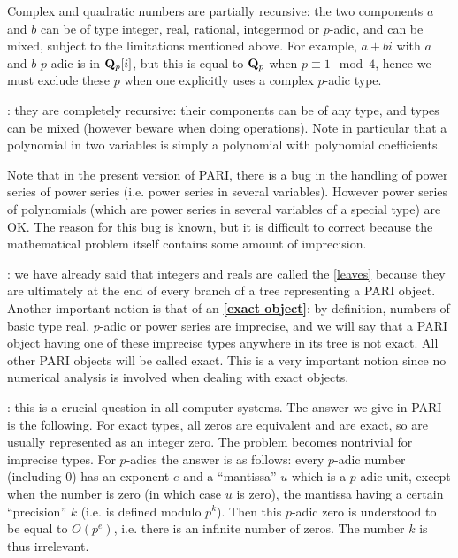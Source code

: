  Complex and quadratic numbers are partially recursive: the two components
$a$ and $b$ can be of type integer, real, rational, integermod or $p$-adic,
and can
be mixed, subject to the limitations mentioned above. For example,
$a+bi$ with $a$ and $b$ $p$-adic is in $\Bbb Q_p[i]$, but this is equal to
$\Bbb Q_p$
when $p\equiv 1 \mod 4$, hence we must exclude these $p$ when one explicitly
uses
a complex $p$-adic type.

: 
they are completely recursive:
their components can be of any type, and types can be mixed
(however beware when doing operations). Note in particular that a polynomial
in two variables is simply a polynomial with polynomial coefficients.

Note that in the present version \vers{} of PARI, there is a bug in the handling
of power series of power series (i.e. power series in several variables).
However power series of polynomials (which are power series in several
variables of a special type) are OK. The reason for this bug is known,
but it is difficult to correct because the mathematical problem itself
contains some amount of imprecision.

: we have already
said that integers and reals are called the \ref{leaves} because they are
ultimately
at the end of every branch of a tree representing a PARI object. Another
important notion is that of an {\bf \ref{exact object}}: by definition,
numbers of basic type real, $p$-adic or power series are imprecise, and we
will
say that a PARI object having one of these imprecise types anywhere in its
tree
is not exact. All other PARI objects will be called exact. This is a very
important notion since no numerical analysis is involved when dealing with
exact objects.

: this is a crucial question in all computer
systems. The answer we give in PARI is the following. For exact types,
all zeros are equivalent and are exact, so are usually represented as
an integer zero. The problem becomes
nontrivial for imprecise types. For $p$-adics the answer is as
follows: every $p$-adic number (including 0) has an exponent $e$ and a
``mantissa'' $u$ which is a $p$-adic unit, except when the number is zero (in
which case $u$ is zero), the mantissa having a certain ``precision'' $k$ (i.e.
is defined modulo $p^k$). Then this $p$-adic zero is understood to be
equal to $O(p^e)$, i.e. there is an infinite number of zeros. The number $k$
is thus irrelevant.

